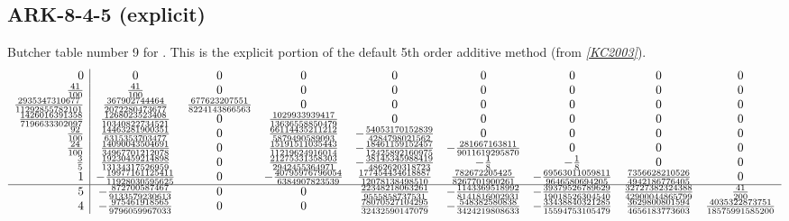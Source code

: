 \documentclass[letterpaper,10pt,english]{sphinxmanual}
\begin{document}
\subsection{ARK-8-4-5 (explicit)}
\label{Butcher:butcher-ark-8-4-5-e}\label{Butcher:ark-8-4-5-explicit}
Butcher table number 9
for {\hyperref[c_interface/User_callable:c.ARKodeSetERKTableNum]{\emph{}}}.  This is
the explicit portion of the default 5th order additive method (from \label{Butcher:id9}{\hyperref[References:kc2003]{\emph{{[}KC2003{]}}}}).
\begin{gather}
\begin{split}\begin{array}{r|cccccccc}
  0 & 0 & 0 & 0 & 0 & 0 & 0 & 0 & 0 \\
  \frac{41}{100} & \frac{41}{100} & 0 & 0 & 0 & 0 & 0 & 0 & 0 \\
  \frac{2935347310677}{11292855782101} & \frac{367902744464}{2072280473677} & \frac{677623207551}{8224143866563} & 0 & 0 & 0 & 0 & 0 & 0 \\
  \frac{1426016391358}{7196633302097} & \frac{1268023523408}{10340822734521} & 0 & \frac{1029933939417}{13636558850479} & 0 & 0 & 0 & 0 & 0 \\
  \frac{92}{100} & \frac{14463281900351}{6315353703477} & 0 & \frac{66114435211212}{5879490589093} & -\frac{54053170152839}{4284798021562} & 0 & 0 & 0 & 0 \\
  \frac{24}{100} & \frac{14090043504691}{34967701212078} & 0 & \frac{15191511035443}{11219624916014} & -\frac{18461159152457}{12425892160975} & -\frac{281667163811}{9011619295870} & 0 & 0 & 0 \\
  \frac{3}{5} & \frac{19230459214898}{13134317526959} & 0 & \frac{21275331358303}{2942455364971} & -\frac{38145345988419}{4862620318723} & -\frac{1}{8} & -\frac{1}{8} & 0 & 0 \\
  1 & -\frac{19977161125411}{11928030595625} & 0 & -\frac{40795976796054}{6384907823539} & \frac{177454434618887}{12078138498510} & \frac{782672205425}{8267701900261} & -\frac{69563011059811}{9646580694205} & \frac{7356628210526}{4942186776405} & 0 \\
  \hline
  5 & -\frac{872700587467}{9133579230613} & 0 & 0 & \frac{22348218063261}{9555858737531} & -\frac{1143369518992}{8141816002931} & -\frac{39379526789629}{19018526304540} & \frac{32727382324388}{42900044865799} & \frac{41}{200} \\
  4 & -\frac{975461918565}{9796059967033} & 0 & 0 & \frac{78070527104295}{32432590147079} & -\frac{548382580838}{3424219808633} & -\frac{33438840321285}{15594753105479} & \frac{3629800801594}{4656183773603} & \frac{4035322873751}{18575991585200}
\end{array}\end{split}\notag
\end{gather}\begin{figure}[htbp]
\centering
\capstart


\end{figure}
\end{document}
